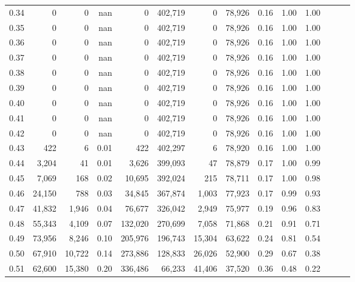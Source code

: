 \begin{tabular}{rrrrrrrrrrrrrr}
0.34 &       0 &       0 &   nan &        0 &  402,719 &       0 &  78,926 &  0.16 &  1.00 &      1.00 \\
0.35 &       0 &       0 &   nan &        0 &  402,719 &       0 &  78,926 &  0.16 &  1.00 &      1.00 \\
0.36 &       0 &       0 &   nan &        0 &  402,719 &       0 &  78,926 &  0.16 &  1.00 &      1.00 \\
0.37 &       0 &       0 &   nan &        0 &  402,719 &       0 &  78,926 &  0.16 &  1.00 &      1.00 \\
0.38 &       0 &       0 &   nan &        0 &  402,719 &       0 &  78,926 &  0.16 &  1.00 &      1.00 \\
0.39 &       0 &       0 &   nan &        0 &  402,719 &       0 &  78,926 &  0.16 &  1.00 &      1.00 \\
0.40 &       0 &       0 &   nan &        0 &  402,719 &       0 &  78,926 &  0.16 &  1.00 &      1.00 \\
0.41 &       0 &       0 &   nan &        0 &  402,719 &       0 &  78,926 &  0.16 &  1.00 &      1.00 \\
0.42 &       0 &       0 &   nan &        0 &  402,719 &       0 &  78,926 &  0.16 &  1.00 &      1.00 \\
0.43 &     422 &       6 &  0.01 &      422 &  402,297 &       6 &  78,920 &  0.16 &  1.00 &      1.00 \\
0.44 &   3,204 &      41 &  0.01 &    3,626 &  399,093 &      47 &  78,879 &  0.17 &  1.00 &      0.99 \\
0.45 &   7,069 &     168 &  0.02 &   10,695 &  392,024 &     215 &  78,711 &  0.17 &  1.00 &      0.98 \\
0.46 &  24,150 &     788 &  0.03 &   34,845 &  367,874 &   1,003 &  77,923 &  0.17 &  0.99 &      0.93 \\
0.47 &  41,832 &   1,946 &  0.04 &   76,677 &  326,042 &   2,949 &  75,977 &  0.19 &  0.96 &      0.83 \\
0.48 &  55,343 &   4,109 &  0.07 &  132,020 &  270,699 &   7,058 &  71,868 &  0.21 &  0.91 &      0.71 \\
0.49 &  73,956 &   8,246 &  0.10 &  205,976 &  196,743 &  15,304 &  63,622 &  0.24 &  0.81 &      0.54 \\
0.50 &  67,910 &  10,722 &  0.14 &  273,886 &  128,833 &  26,026 &  52,900 &  0.29 &  0.67 &      0.38 \\
0.51 &  62,600 &  15,380 &  0.20 &  336,486 &   66,233 &  41,406 &  37,520 &  0.36 &  0.48 &      0.22 \\

\end{tabular}
